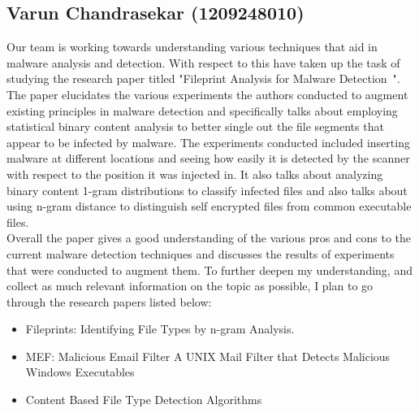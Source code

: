 \documentclass[16pt]{article}
\begin{document}
		\subsection{Varun Chandrasekar (1209248010)}
		Our team is working towards understanding various techniques that aid in malware analysis and detection. With respect to this have taken up the task of studying the research paper titled "Fileprint Analysis for Malware Detection~\cite{stolfo2005fileprint}". The paper elucidates the various experiments the authors conducted to augment existing principles in malware detection and specifically talks about employing statistical binary content analysis to better single out the file segments that appear to be infected by malware. The experiments conducted included inserting malware at different locations and seeing how easily it is detected by the scanner with respect to the position it was injected in. It also talks about analyzing binary content 1-gram distributions to classify infected files and also talks about using n-gram distance to distinguish self encrypted files from common executable files.\\
		
		Overall the paper gives a good understanding of the various pros and cons to the current malware detection techniques and discusses the results of experiments that were conducted to augment them. To further deepen my understanding, and collect as much relevant information on the topic as possible, I plan to go through the research papers listed below:
		\begin{itemize}
			\item Fileprints: Identifying File Types by n-gram Analysis.~\cite{li2005fileprints}
			\item MEF: Malicious Email Filter A UNIX Mail Filter that Detects Malicious Windows Executables~\cite{schultz2001mef}
			\item Content Based File Type Detection Algorithms~\cite{mcdaniel2003content}
		\end{itemize}
\end{document}
